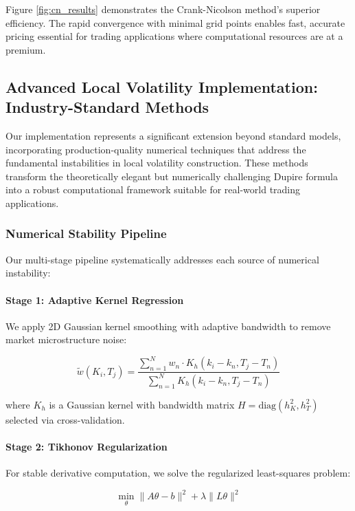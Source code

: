 \documentclass[11pt,a4paper]{article}
\begin{document}
Figure \ref{fig:cn_results} demonstrates the Crank-Nicolson method's superior efficiency. The rapid convergence with minimal grid points enables fast, accurate pricing essential for trading applications where computational resources are at a premium.

\subsection{Advanced Local Volatility Implementation: Industry-Standard Methods}
\label{sec:numerical_methods}

Our implementation represents a significant extension beyond standard models, incorporating production-quality numerical techniques that address the fundamental instabilities in local volatility construction. These methods transform the theoretically elegant but numerically challenging Dupire formula into a robust computational framework suitable for real-world trading applications.

\subsubsection{Numerical Stability Pipeline}

Our multi-stage pipeline systematically addresses each source of numerical instability:

\paragraph{Stage 1: Adaptive Kernel Regression}
We apply 2D Gaussian kernel smoothing with adaptive bandwidth to remove market microstructure noise:

\begin{equation}
\tilde{w}(K_i, T_j) = \frac{\sum_{n=1}^N w_n \cdot K_h(k_i - k_n, T_j - T_n)}{\sum_{n=1}^N K_h(k_i - k_n, T_j - T_n)}
\end{equation}

where $K_h$ is a Gaussian kernel with bandwidth matrix $H = \text{diag}(h_K^2, h_T^2)$ selected via cross-validation.

\paragraph{Stage 2: Tikhonov Regularization}
For stable derivative computation, we solve the regularized least-squares problem:

\begin{equation}
\min_{\theta} \|A\theta - b\|^2 + \lambda\|L\theta\|^2
\end{equation}
\end{document}
